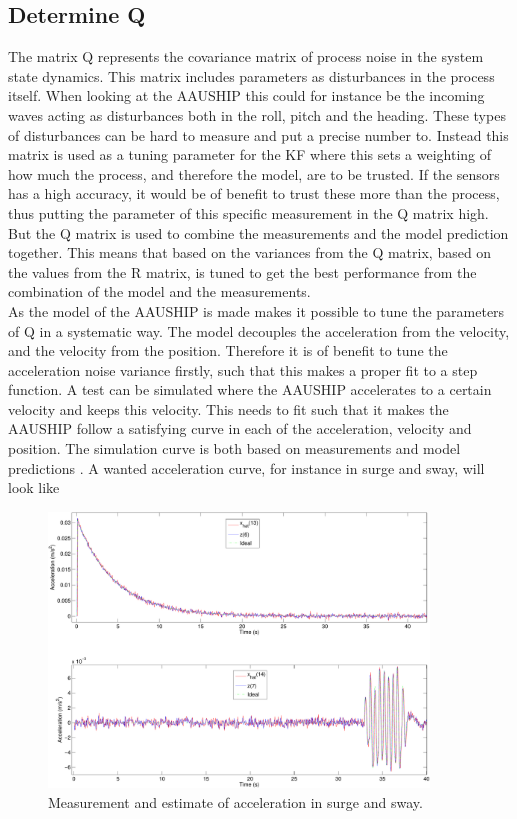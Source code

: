 \subsection{Determine Q}
The matrix Q represents the covariance matrix of process noise in the system state dynamics. This matrix includes parameters as disturbances in the process itself. When looking at the AAUSHIP this could for instance be the incoming waves acting as disturbances both in the roll, pitch and the heading. These types of disturbances can be hard to measure and put a precise number to. Instead this matrix is used as a tuning parameter for the \ac{KF} where this sets a weighting of how much the process, and therefore the model, are to be trusted. If the sensors has a high accuracy, it would be of benefit to trust these more than the process, thus putting the parameter of this specific measurement in the Q matrix high. But the Q matrix is used to combine the measurements and the model prediction together. This means that based on the variances from the Q matrix, based on the values from the R matrix, is tuned to get the best performance from the combination of the model and the measurements.\\
As the model of the AAUSHIP is made makes it possible to tune the parameters of Q in a systematic way. The model decouples the acceleration from the velocity, and the velocity from the position. Therefore it is of benefit to tune the acceleration noise variance firstly, such that this makes a proper fit to a step function. A test can be simulated where the AAUSHIP accelerates to a certain velocity and keeps this velocity. This needs to fit such that it makes the AAUSHIP follow a satisfying curve in each of the acceleration, velocity and position. The simulation curve is both based on measurements and model predictions . A wanted acceleration curve, for instance in surge and sway, will look like
\begin{figure}
  \includegraphics[width=0.9\textwidth]{../../code/matlab/accel0,00001}
  \caption{Measurement and estimate of acceleration in surge and sway.}
  \label{fig:uvacceltest}
\end{figure}
